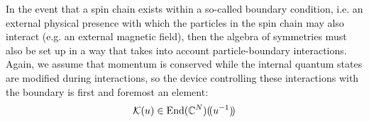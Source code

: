 In the event that a spin chain exists within a so-called boundary condition, i.e. an external physical presence with which the particles in the spin chain may also interact (e.g. an external magnetic field), then the algebra of symmetries must also be set up in a way that takes into account particle-boundary interactions. Again, we assume that momentum is conserved while the internal quantum states are modified during interactions, so the device controlling these interactions with the boundary is first and foremost an element:
    $$\mathcal{K}(u) \in \operatorname{End}(\mathbb{C}^N)(\!(u^{-1})\!)$$

